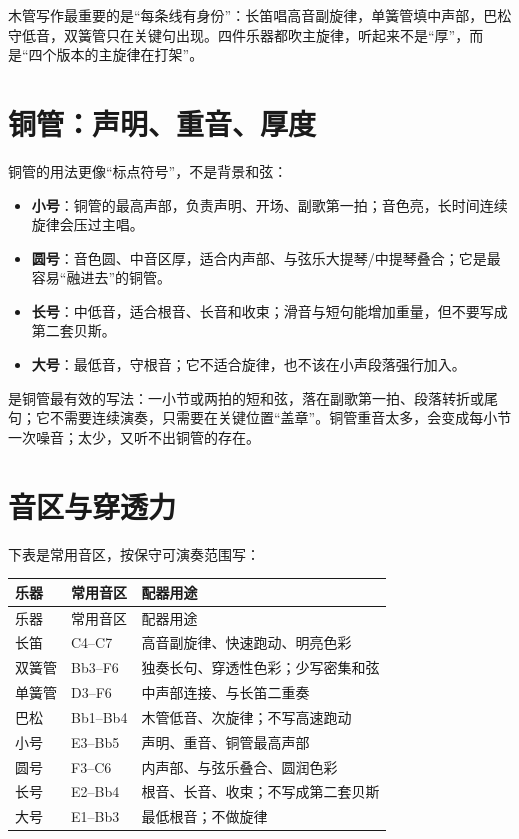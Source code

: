 木管写作最重要的是“每条线有身份”：长笛唱高音副旋律，单簧管填中声部，巴松守低音，双簧管只在关键句出现。四件乐器都吹主旋律，听起来不是“厚”，而是“四个版本的主旋律在打架”。

\section{铜管：声明、重音、厚度}
\label{sec:brass}

铜管的用法更像“标点符号”，不是背景和弦：

\begin{itemize}
\item \textbf{小号}：铜管的最高声部，负责声明、开场、副歌第一拍；音色亮，长时间连续旋律会压过主唱。
\item \textbf{圆号}：音色圆、中音区厚，适合内声部、与弦乐大提琴/中提琴叠合；它是最容易“融进去”的铜管。
\item \textbf{长号}：中低音，适合根音、长音和收束；滑音与短句能增加重量，但不要写成第二套贝斯。
\item \textbf{大号}：最低音，守根音；它不适合旋律，也不该在小声段落强行加入。
\end{itemize}

是铜管最有效的写法：一小节或两拍的短和弦，落在副歌第一拍、段落转折或尾句；它不需要连续演奏，只需要在关键位置“盖章”。铜管重音太多，会变成每小节一次噪音；太少，又听不出铜管的存在。

\section{音区与穿透力}
\label{sec:winds-ranges}

下表是常用音区，按保守可演奏范围写：

\begin{longtable}{p{}p{}p{}}
\toprule
乐器 & 常用音区 & 配器用途 \\
\midrule
\endfirsthead
\toprule
乐器 & 常用音区 & 配器用途 \\
\midrule
\endhead
长笛 & C4--C7 & 高音副旋律、快速跑动、明亮色彩 \\
双簧管 & Bb3--F6 & 独奏长句、穿透性色彩；少写密集和弦 \\
单簧管 & D3--F6 & 中声部连接、与长笛二重奏 \\
巴松 & Bb1--Bb4 & 木管低音、次旋律；不写高速跑动 \\
小号 & E3--Bb5 & 声明、重音、铜管最高声部 \\
圆号 & F3--C6 & 内声部、与弦乐叠合、圆润色彩 \\
长号 & E2--Bb4 & 根音、长音、收束；不写成第二套贝斯 \\
大号 & E1--Bb3 & 最低根音；不做旋律 \\
\bottomrule
\end{longtable}


